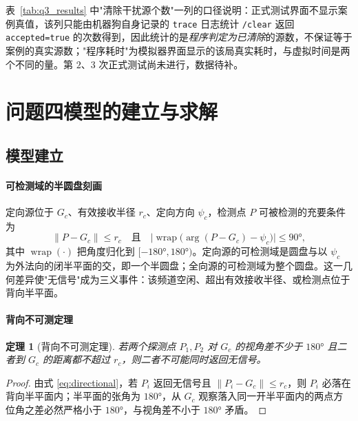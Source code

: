\documentclass[12pt,a4paper]{ctexart}
\newtheorem{theorem}{定理}[section]
\begin{document}
\noindent 表~\ref{tab:q3_results} 中"清除干扰源个数"一列的口径说明：正式测试界面不显示案例真值，该列只能由机器狗自身记录的 \texttt{trace} 日志统计 \texttt{/clear} 返回 \texttt{accepted=true} 的次数得到，因此统计的是\emph{程序判定为已清除}的源数，不保证等于案例的真实源数；"程序耗时"为模拟器界面显示的该局真实耗时，与虚拟时间是两个不同的量。第 $2$、$3$ 次正式测试尚未进行，数据待补。

\section{问题四模型的建立与求解}
\label{sec:q4}

\subsection{模型建立}

\paragraph{可检测域的半圆盘刻画}
定向源位于 $G_c$、有效接收半径 $r_c$、定向方向 $\psi_c$，检测点 $P$ 可被检测的充要条件为
\begin{equation}
  \|P-G_c\|\le r_c \quad\text{且}\quad
  \bigl|\operatorname{wrap}\bigl(\arg(P-G_c)-\psi_c\bigr)\bigr|\le90°,
  \label{eq:directional}
\end{equation}
其中 $\operatorname{wrap}(\cdot)$ 把角度归化到 $[-180°,180°)$。定向源的可检测域是圆盘与以 $\psi_c$ 为外法向的闭半平面的交，即一个半圆盘；全向源的可检测域为整个圆盘。这一几何差异使"无信号"成为三义事件：该频道空闲、超出有效接收半径、或检测点位于背向半平面。

\paragraph{背向不可测定理}
\begin{theorem}[背向不可测定理]
若两个探测点 $P_1,P_2$ 对 $G_c$ 的视角差不少于 $180°$ 且二者到 $G_c$ 的距离都不超过 $r_c$，则二者不可能同时返回无信号。
\end{theorem}

\begin{proof}
由式 \eqref{eq:directional}，若 $P_i$ 返回无信号且 $\|P_i-G_c\|\le r_c$，则 $P_i$ 必落在背向半平面内；半平面的张角为 $180°$，从 $G_c$ 观察落入同一开半平面内的两点方位角之差必然严格小于 $180°$，与视角差不小于 $180°$ 矛盾。
\end{proof}
\end{document}
